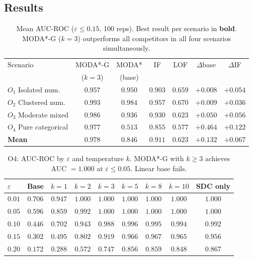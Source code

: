 \documentclass[11pt]{article}
\theoremstyle{plain}
\theoremstyle{definition}
\begin{document}
\subsection{Results}

\begin{table}[ht]
\centering
\caption{Mean AUC-ROC ($\varepsilon \leq 0.15$,
  100 reps). Best result per scenario in \textbf{bold}.
  MODA*-G ($k{=}3$) outperforms all competitors in
  all four scenarios simultaneously.}
\label{tab:main}
\small
\begin{tabular}{lcccccc}
\toprule
Scenario & MODA*-G & MODA* & IF & LOF
  & $\Delta$base & $\Delta$IF \\
 & ($k=3$) & (base) & & & & \\
\midrule
$O_1$ Isolated num.
  & $\mathbf{0.957}$ & $0.950$ & $0.903$ & $0.659$
  & $+0.008$ & $+0.054$ \\
$O_2$ Clustered num.
  & $\mathbf{0.993}$ & $0.984$ & $0.957$ & $0.670$
  & $+0.009$ & $+0.036$ \\
$O_3$ Moderate mixed
  & $\mathbf{0.986}$ & $0.936$ & $0.930$ & $0.623$
  & $+0.050$ & $+0.056$ \\
$O_4$ Pure categorical
  & $\mathbf{0.977}$ & $0.513$ & $0.855$ & $0.577$
  & $+0.464$ & $+0.122$ \\
\midrule
\textbf{Mean}
  & $\mathbf{0.978}$ & $0.846$ & $0.911$ & $0.623$
  & $+0.132$ & $+0.067$ \\
\bottomrule
\end{tabular}
\end{table}

\begin{table}[ht]
\centering
\caption{O4: AUC-ROC by $\varepsilon$ and temperature
  $k$. MODA*-G with $k \geq 3$ achieves AUC $= 1.000$
  at $\varepsilon \leq 0.05$. Linear base fails.}
\label{tab:o4}
\small
\begin{tabular}{lcccccccc}
\toprule
$\varepsilon$ & Base & $k{=}1$ & $k{=}2$ & $k{=}3$
  & $k{=}5$ & $k{=}8$ & $k{=}10$ & SDC only\\
\midrule
$0.01$ & $0.706$ & $0.947$ & $1.000$ & $\mathbf{1.000}$
  & $1.000$ & $1.000$ & $1.000$ & $1.000$ \\
$0.05$ & $0.596$ & $0.859$ & $0.992$ & $\mathbf{1.000}$
  & $1.000$ & $1.000$ & $1.000$ & $1.000$ \\
$0.10$ & $0.446$ & $0.702$ & $0.943$ & $0.988$
  & $\mathbf{0.996}$ & $0.995$ & $0.994$ & $0.992$ \\
$0.15$ & $0.302$ & $0.495$ & $0.802$ & $0.919$
  & $0.966$ & $\mathbf{0.967}$ & $0.965$ & $0.956$ \\
$0.20$ & $0.172$ & $0.288$ & $0.572$ & $0.747$
  & $0.856$ & $\mathbf{0.859}$ & $0.848$ & $0.867$ \\
\bottomrule
\end{tabular}
\end{table}
\end{document}
